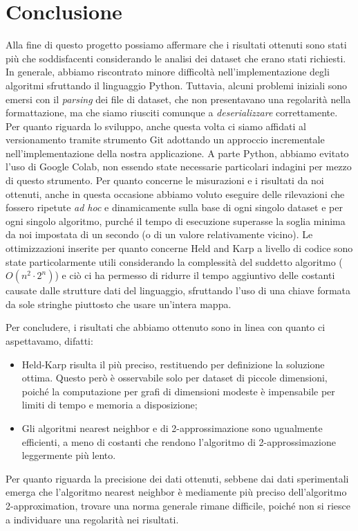 \section{Conclusione}

Alla fine di questo progetto possiamo affermare che i risultati ottenuti sono stati più che soddisfacenti considerando le analisi dei dataset che erano stati richiesti. In generale, abbiamo riscontrato minore difficoltà nell'implementazione degli algoritmi sfruttando il linguaggio Python. Tuttavia, alcuni problemi iniziali sono emersi con il \textit{parsing} dei file di dataset, che non presentavano una regolarità nella formattazione, ma che siamo riusciti comunque a \textit{deserializzare} correttamente. \\
Per quanto riguarda lo sviluppo, anche questa volta ci siamo affidati al versionamento tramite strumento Git adottando un approccio incrementale nell'implementazione della nostra applicazione. A parte Python, abbiamo evitato l'uso di Google Colab, non essendo state necessarie particolari indagini per mezzo di questo strumento. 
Per quanto concerne le misurazioni e i risultati da noi ottenuti, anche in questa occasione abbiamo voluto eseguire delle rilevazioni che fossero ripetute \textit{ad hoc} e dinamicamente sulla base di ogni singolo dataset e per ogni singolo algoritmo, purché il tempo di esecuzione superasse la soglia minima da noi impostata di un secondo (o di un valore relativamente vicino).
Le ottimizzazioni inserite per quanto concerne Held and Karp a livello di codice sono state particolarmente utili considerando la complessità del suddetto algoritmo (\(O(n^2\cdot2^n)\)) e ciò ci ha permesso di ridurre il tempo aggiuntivo delle costanti causate dalle strutture dati del linguaggio, sfruttando l'uso di una chiave formata da sole stringhe piuttosto che usare un'intera mappa. 


Per concludere, i risultati che abbiamo ottenuto sono in linea con quanto ci aspettavamo, difatti:
\begin{itemize}
  \item Held-Karp risulta il più preciso, restituendo per definizione la soluzione ottima. Questo però è osservabile solo per dataset di piccole dimensioni, poiché la computazione per grafi di dimensioni modeste è impensabile per limiti di tempo e memoria a disposizione;
  \item Gli algoritmi nearest neighbor e di 2-approssimazione sono ugualmente efficienti, a meno di costanti che rendono l'algoritmo di 2-approssimazione leggermente più lento.
\end{itemize}

Per quanto riguarda la precisione dei dati ottenuti, sebbene dai dati sperimentali emerga che l'algoritmo nearest neighbor è mediamente più preciso dell'algoritmo 2-approximation, trovare una norma generale rimane difficile, poiché non si riesce a individuare una regolarità nei risultati.